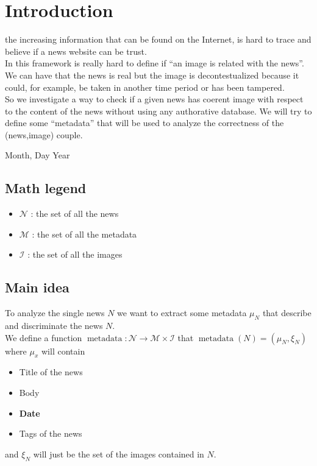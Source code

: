\documentclass[10pt, journal,twocolumn]{IEEEtran}
\DeclareMathOperator{\mtdt}{metadata}
\begin{document}
\section{Introduction}
% 
% 
% 
% 
 the increasing information that can be found on the Internet, is hard to trace and believe if a news website can be trust.\\
In this framework is really hard to define if ``an image is related with the news''. We can have that the news is real but the image is decontestualized because it could, for example, be taken in another time period or has been tampered.\\
So we investigate a way to check if a given news has coerent image with respect to the content of the news without using any authorative database. We will try to define some ``metadata'' that will be used to analyze the correctness of the (news,image) couple.
 
\hfill Month, Day Year

\subsection{Math legend}
\begin{itemize}
	\item $\mathcal{N}$ : the set of all the news
	\item $\mathcal{M}$ : the set of all the metadata
	\item $\mathcal{I}$ : the set of all the images
\end{itemize}

\subsection{Main idea}


To analyze the single news $N$ we want to extract some metadata $\mu_N$ that describe and discriminate the news $N$.\\
We define a function $\mtdt : \mathcal{N} \rightarrow \mathcal{M} \times \mathcal{I}$ that $\mtdt(N) = (\mu_N , \xi_N)$ where $\mu_x$ will contain 
\begin{itemize}
 	\item Title of the news
 	\item Body
 	\item \textbf{Date}
 	\item Tags of the news \label{tags1}
\end{itemize} 
and $\xi_N$ will just be the set of the images contained in $N$.\\[0,1cm]
\end{document}
